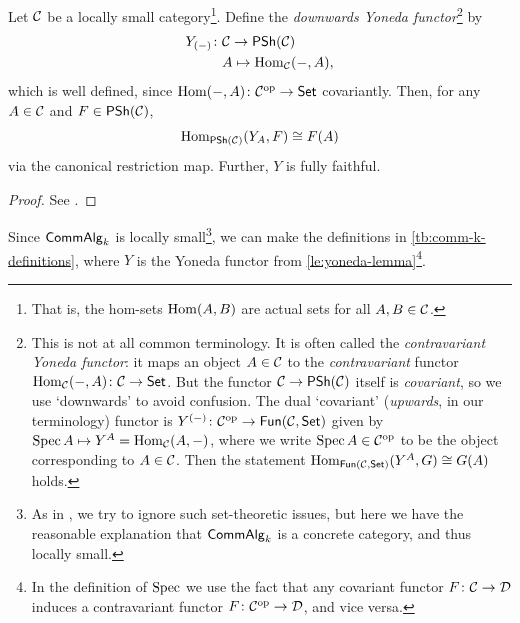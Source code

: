         \begin{lemma}\label{le:yoneda-lemma}
            Let $\mathcal{C}$ be a locally small category\footnote{
                That is, the hom-sets $\operatorname{Hom}(A,B)$ are actual sets for all $A,B\in\mathcal{C}$.
            }.
            Define the \emph{downwards Yoneda functor}\footnote{
                This is not at all common terminology.
                It is often called the \emph{contravariant Yoneda functor}: it maps an object $A\in\mathcal{C}$ to the \emph{contravariant} functor $\operatorname{Hom}_{\mathcal{C}}({-},A)\colon\mathcal{C}\to\mathsf{Set}$.
                But the functor $\mathcal{C}\to\mathsf{PSh}(\mathcal{C})$ itself is \emph{covariant}, so we use `downwards' to avoid confusion.
                The dual `covariant' (\emph{upwards}, in our terminology) functor is $Y^{({-})}\colon{\mathcal{C}}^{\mathrm{op}}\to\mathsf{Fun}(\mathcal{C},\mathsf{Set})$ given by $\operatorname{Spec} A\mapsto Y^A=\operatorname{Hom}_{\mathcal{C}}(A,{-})$, where we write $\operatorname{Spec} A\in{\mathcal{C}}^{\mathrm{op}}$ to be the object corresponding to $A\in\mathcal{C}$.
                Then the statement $\operatorname{Hom}_{\mathsf{Fun}(\mathcal{C},\mathsf{Set})}(Y^A,G)\cong G(A)$ holds.
            } by
            \begin{align*}
                Y_{({-})}\colon&\mathcal{C}\to\mathsf{PSh}(\mathcal{C})\\
                &A\mapsto \operatorname{Hom}_{\mathcal{C}}({-}, A),
            \end{align*}
            which is well defined, since $\operatorname{Hom}({-}, A)\colon{\mathcal{C}}^{\mathrm{op}}\to\mathsf{Set}$ covariantly.
            Then, for any $A\in\mathcal{C}$ and $F\in\mathsf{PSh}(\mathcal{C})$,
            \begin{equation}
                \operatorname{Hom}_{\mathsf{PSh}(\mathcal{C})}(Y_A,F) \cong F(A)
            \end{equation}
            via the canonical restriction map.
            Further, $Y$ is fully faithful.
        \end{lemma}

        \begin{proof}
            See \cite[\S III.2, p.59--62]{Lane:1998fe}.
        \end{proof}

        Since $\mathsf{CommAlg}_k$ is locally small\footnote{
            As in \cite{Toen:2005wxa}, we try to ignore such set-theoretic issues, but here we have the reasonable explanation that $\mathsf{CommAlg}_k$ is a concrete category, and thus locally small.
        }, we can make the definitions in \cref{tb:comm-k-definitions}, where $Y$ is the Yoneda functor from \cref{le:yoneda-lemma}\footnote{
            In the definition of $\operatorname{Spec}$ we use the fact that any covariant functor $F\colon\mathcal{C}\to\mathcal{D}$ induces a contravariant functor $F\colon{\mathcal{C}}^{\mathrm{op}}\to\mathcal{D}$, and vice versa.
        }.
        

